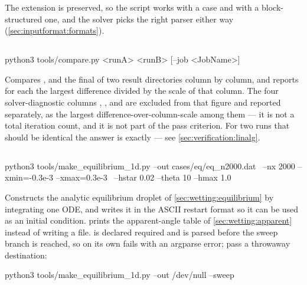 \begin{note}
  The extension is preserved, so the script works with a  case and
  with a block-structured  one, and the solver picks the right parser either
  way (\cref{sec:inputformat:formats}).
\end{note}

\subsection{}

\begin{shell}
python3 tools/compare.py <runA> <runB> [--job <JobName>]
\end{shell}

Compares ,  and the final
 of two result directories column by column, and reports for
each the largest difference divided by the scale of that column. The four
solver-diagnostic columns , , 
and  are excluded from that figure and reported separately,
as the largest difference-over-column-scale among them --- it is not a total
iteration count, and it is not part of the pass criterion. For two runs that
should be identical the answer is  exactly --- see
\cref{sec:verification:linalg}.

\subsection{}

\begin{shell}
python3 tools/make_equilibrium_1d.py --out cases/eq/eq_n2000.dat \
        --nx 2000 --xmin=-0.3e-3 --xmax=0.3e-3 \
        --hstar 0.02 --theta 10 --hmax 1.0
\end{shell}

Constructs the analytic equilibrium droplet of \cref{sec:wetting:equilibrium}
by integrating one ODE, and writes it in the ASCII restart format so it can be
used as an initial condition.  prints the apparent-angle table of
\cref{sec:wetting:apparent} instead of writing a file. \code{--out} is declared
required and is parsed before the sweep branch is reached, so \code{--sweep}
on its own fails with an argparse error; pass a throwaway destination:

\begin{shell}
python3 tools/make_equilibrium_1d.py --out /dev/null --sweep
\end{shell}

